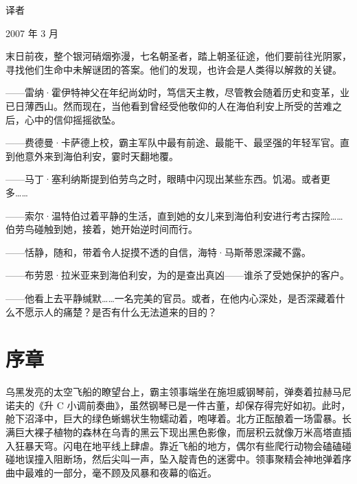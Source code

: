 \documentclass[AutoFakeBold=true]{book}
\begin{document}
\begin{flushright}
	译者

	2007 年 3 月
\end{flushright}

\newpage
\pagestyle{empty}

末日前夜，整个银河硝烟弥漫，七名朝圣者，踏上朝圣征途，他们要前往光阴冢，寻找他们生命中未解谜团的答案。他们的发现，也许会是人类得以解救的关键。

\vspace{1em}{\heiti 牧师}——雷纳·霍伊特神父在年纪尚幼时，笃信天主教，尽管教会随着历史和变革，业已日薄西山。然而现在，当他看到曾经受他敬仰的人在海伯利安上所受的苦难之后，心中的信仰摇摇欲坠。

\vspace{1em}{\heiti 士兵}——费德曼·卡萨德上校，霸主军队中最有前途、最能干、最坚强的年轻军官。直到他意外来到海伯利安，霎时天翻地覆。

\vspace{1em}{\heiti 诗人}——马丁·塞利纳斯提到伯劳鸟之时，眼睛中闪现出某些东西。饥渴。或者更多……

\vspace{1em}{\heiti 学者}——索尔·温特伯过着平静的生活，直到她的女儿来到海伯利安进行考古探险……伯劳鸟碰触到她，接着，她开始逆时间而行。

\vspace{1em}{\heiti 船长}——恬静，随和，带着令人捉摸不透的自信，海特·马斯蒂恩深藏不露。

\vspace{1em}{\heiti 侦探}——布劳恩·拉米亚来到海伯利安，为的是查出真凶——谁杀了受她保护的客户。

\vspace{1em}{\heiti 领事}——他看上去平静缄默……一名完美的官员。或者，在他内心深处，是否深藏着什么不愿示人的痛楚？是否有什么无法道来的目的？

\newpage
\pagestyle{headings}

\chapter{序章}

乌黑发亮的太空飞船的瞭望台上，霸主领事端坐在施坦威钢琴前，弹奏着拉赫马尼诺夫的《升 C 小调前奏曲》，虽然钢琴已是一件古董，却保存得完好如初。此时，舱下沼泽中，巨大的绿色蜥蜴状生物蠕动着，咆哮着。北方正酝酿着一场雷暴。长满巨大裸子植物的森林在乌青的黑云下现出黑色影像，而层积云就像万米高塔直插入狂暴天穹。闪电在地平线上肆虐。靠近飞船的地方，偶尔有些爬行动物会磕磕碰碰地误撞入阻断场，然后尖叫一声，坠入靛青色的迷雾中。领事聚精会神地弹着序曲中最难的一部分，毫不顾及风暴和夜幕的临近。
\end{document}
